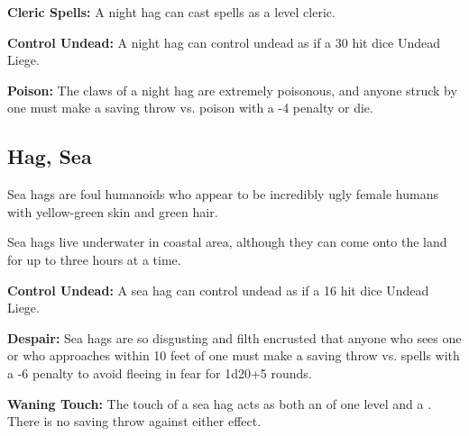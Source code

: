 \begin{multicols*}{2}
\textbf{Cleric Spells:} A night hag can cast spells as a  level cleric.

\textbf{Control Undead:} A night hag can control undead as if a 30 hit dice Undead Liege.

\textbf{Poison:} The claws of a night hag are extremely poisonous, and anyone struck by one must make a saving throw vs. poison with a -4 penalty or die.

\subsection{Hag, Sea}

Sea hags are foul humanoids who appear to be incredibly ugly female humans with yellow-green skin and green hair.

Sea hags live underwater in coastal area, although they can come onto the land for up to three hours at a time.

\textbf{Control Undead:} A sea hag can control undead as if a 16 hit dice Undead Liege.

\textbf{Despair:} Sea hags are so disgusting and filth encrusted that anyone who sees one or who approaches within 10 feet of one must make a saving throw vs. spells with a -6 penalty to avoid fleeing in fear for 1d20+5 rounds.

\textbf{Waning Touch:} The touch of a sea hag acts as both an  of one level and a . There is no saving throw against either effect.


\end{multicols*}
